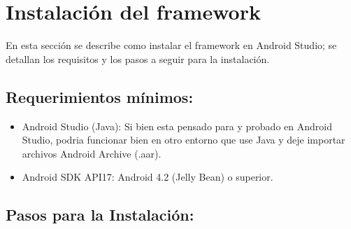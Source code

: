 \chapter{Instalación del framework}
En esta sección se describe como instalar el framework en Android Studio; se detallan los requisitos y los pasos a seguir para la instalación.

\section{Requerimientos mínimos:}

\begin{itemize}
\item Android Studio (Java): Si bien esta pensado para y probado en Android Studio, podria funcionar bien en otro entorno que use Java y deje importar archivos Android Archive (.aar).
\item Android SDK API17: Android 4.2 (Jelly Bean) o superior.
\end{itemize}

\section{Pasos para la Instalación:}

